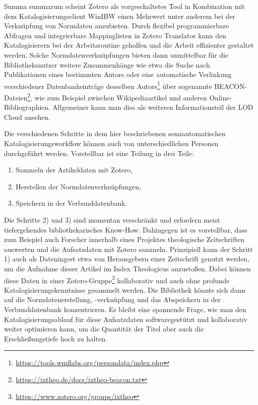 \documentclass[a4paper,
fontsize=11pt,
oneside,
numbers=noperiodatend,
parskip=half-,
bibliography=totoc,
final
]{scrartcl}
\begin{document}
Summa summarum scheint Zotero als vorgeschaltetes Tool in Kombination
mit dem Katalogisierungsclient WinIBW einen Mehrwert unter anderem bei
der Verknüpfung von Normdaten anzubieten. Durch flexibel programmierbare
Abfragen und integrierbare Mappinglisten in Zotero Translator kann den
Katalogisierern bei der Arbeitsroutine geholfen und die Arbeit
effizienter gestaltet werden. Solche Normdatenverknüpfungen bieten dann
unmittelbar für die Bibliotheksnutzer weitere Zusammenhänge wie etwa die
Suche nach Publikationen eines bestimmten Autors oder eine automatische
Verlinkung verschiedener Datenbankeinträge desselben Autors\footnote{\url{https://tools.wmflabs.org/persondata/index.php}}
über sogenannte BEACON-Dateien\footnote{\url{https://ixtheo.de/docs/ixtheo-beacon.txt}},
wie zum Beispiel zwischen Wikipediaartikel und anderen
Online-Bibliographien. Allgemeiner kann man dies als weiteren
Informationsteil der LOD Cloud ansehen.

Die verschiedenen Schritte in dem hier beschriebenen semiautomatischen
Katalogisierungsworkflow können auch von unterschiedlichen Personen
durchgeführt werden. Vorstellbar ist eine Teilung in drei Teile:

\begin{enumerate}
\def\labelenumi{\arabic{enumi}.}
\item
  Sammeln der Artikeldaten mit Zotero,
\item
  Herstellen der Normdatenverknüpfungen,
\item
  Speichern in der Ver\-bund\-daten\-bank.
\end{enumerate}

Die Schritte 2) und 3) sind momentan verschränkt und erfordern meist
tiefergehendes bibliothekarisches Know-How. Dahingegen ist es
vorstellbar, dass zum Beispiel auch Forscher innerhalb eines Projektes
theologische Zeitschriften auswerten und die Aufsatzdaten mit Zotero
sammeln. Prinzipiell kann der Schritt 1) auch als Dateningest etwa von
Herausgebern einer Zeitschrift genutzt werden, um die Aufnahme dieser
Artikel im Index Theologicus anzustoßen. Dabei können diese Daten in
einer Zotero-Gruppe\footnote{\url{https://www.zotero.org/groups/ixtheo}}
kollaborativ und auch ohne profunde Katalogisierungskenntnisse gesammelt
werden. Die Bibliothek könnte sich dann auf die Normdatenerstellung,
-verknüpfung und das Abspeichern in der Ver\-bund\-daten\-bank konzentrieren.
Es bleibt eine spannende Frage, wie man den Katalogisierungsablauf für
diese Aufsatzdaten softwaregestützt und kollaborativ weiter optimieren
kann, um die Quantität der Titel aber auch die Erschließungstiefe hoch
zu halten.
\end{document}
